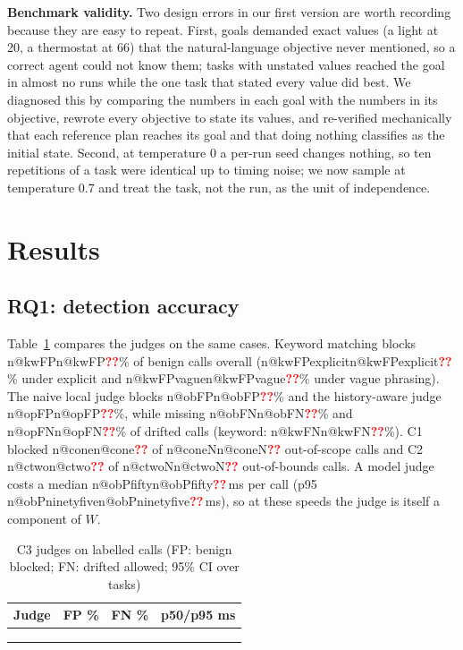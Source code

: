 \documentclass[conference]{IEEEtran}
\makeatletter
\newcommand{\pend}{\textcolor{red}{\textbf{??}}}
\newcommand{\num}[1]{\ifcsname n@#1\endcsname\csname n@#1\endcsname\else\pend\fi}
\newcommand{\tabin}[1]{\IfFileExists{paper_out/#1.tex}{\\}{\pend\ run analyze.py \\}}
\makeatother
\begin{document}
\textbf{Benchmark validity.} Two design errors in our first version are worth recording because they are easy to repeat. First, goals demanded exact values (a light at 20, a thermostat at 66) that the natural-language objective never mentioned, so a correct agent could not know them; tasks with unstated values reached the goal in almost no runs while the one task that stated every value did best. We diagnosed this by comparing the numbers in each goal with the numbers in its objective, rewrote every objective to state its values, and re-verified mechanically that each reference plan reaches its goal and that doing nothing classifies as the initial state. Second, at temperature 0 a per-run seed changes nothing, so ten repetitions of a task were identical up to timing noise; we now sample at temperature 0.7 and treat the task, not the run, as the unit of independence.

\section{Results}
\subsection{RQ1: detection accuracy}
Table~\ref{tab:judge} compares the judges on the same cases. Keyword matching blocks \num{kwFP}\% of benign calls overall (\num{kwFPexplicit}\% under explicit and \num{kwFPvague}\% under vague phrasing). The naive local judge blocks \num{obFP}\% and the history-aware judge \num{opFP}\%, while missing \num{obFN}\% and \num{opFN}\% of drifted calls (keyword: \num{kwFN}\%). C1 blocked \num{cone} of \num{coneN} out-of-scope calls and C2 \num{ctwo} of \num{ctwoN} out-of-bounds calls. A model judge costs a median \num{obPfifty}\,ms per call (p95 \num{obPninetyfive}\,ms), so at these speeds the judge is itself a component of $W$.
\begin{table}[t]\centering\caption{C3 judges on labelled calls (FP: benign blocked; FN: drifted allowed; 95\% CI over tasks)}\label{tab:judge}\footnotesize
\begin{tabular}{lccc}\toprule Judge & FP \% & FN \% & p50/p95 ms\\\midrule
\tabin{tab_judge}
\bottomrule\end{tabular}
\end{table}
\end{document}
